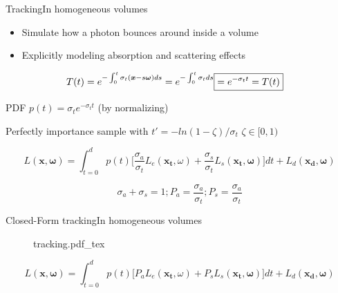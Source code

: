 \documentclass[
  english,            %
  aspectratio=169,    %
]{tumbeamer}
\newcommand\bx[0]{\bm{x}}
\newcommand\bomega[0]{\bm{\omega}}
\begin{document}
\begin{frame}{Tracking}{In homogeneous volumes}
    \begin{itemize}
        \item Simulate how a photon bounces around inside a volume
        \item Explicitly modeling absorption and scattering effects
    \end{itemize}
\begin{align}
    T(t) = e^{-\int_0^t \sigma_t(\bx-s\bomega)ds} = e^{-\int_0^t \sigma_t ds} 
    \Aboxed{= e^{-\sigma_t t} = T(t)}
\end{align}

PDF $p(t) = \sigma_t e^{-\sigma_t t}$ (by normalizing) 

Perfectly importance sample with $t' = -ln(1-\zeta)/\sigma_t$ 
\hfill $\zeta \in [0,1)$

\begin{equation}
    L(\bm{x}, \bm{\omega}) = \int_{t=0}^{d} p(t) 
    \Big[ \frac{\sigma_a}{\sigma_t} L_e(\bm{x_t}, \omega)
    + \frac{\sigma_s}{\sigma_t} L_s(\bm{x_t}, \bomega)
    \Big]dt + L_d(\bm{x_d}, \bm{\omega})
\end{equation}

\begin{equation}
  \sigma_a + \sigma_s = 1;
  P_a = \frac{\sigma_a}{\sigma_t}; P_s = \frac{\sigma_a}{\sigma_t}
\end{equation}

\end{frame}

\begin{frame}{Closed-Form tracking}{In homogeneous volumes}
\begin{figure}[ht]
    \centering
    \def\svgwidth{0.7\columnwidth}
    {tracking.pdf_tex}
\end{figure}

\begin{equation}
    L(\bm{x}, \bm{\omega}) = \int_{t=0}^{d} p(t) 
    \Big[ P_a L_e(\bm{x_t}, \omega)
    + P_s L_s(\bm{x_t}, \bomega)
    \Big]dt + L_d(\bm{x_d}, \bm{\omega})
\end{equation}
\end{frame}
\end{document}
